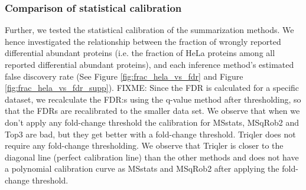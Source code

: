 \documentclass[10pt,letterpaper]{article}
\begin{document}
\subsubsection*{Comparison of statistical calibration}

Further, we tested the statistical calibration of the summarization methods. We hence investigated the relationship between the fraction of wrongly reported differential abundant proteins (i.e. the fraction of HeLa proteins among all reported differential abundant proteins), and each inference method's estimated false discovery rate (See Figure \ref{fig:frac_hela_vs_fdr} and Figure \ref{fig:frac_hela_vs_fdr_supp}). FIXME: Since the FDR is calculated for a specific dataset, we recalculate the FDR:s using the q-value method after thresholding, so that the FDRs are recalibrated to the smaller data set. We observe that when we don't apply any fold-change threshold the calibration for MSstats, MSqRob2 and Top3 are bad, but they get better with a fold-change threshold. Triqler does not require any fold-change thresholding. We observe that Triqler is closer to the diagonal line (perfect calibration line) than the other methods and does not have a polynomial calibration curve as MSstats and MSqRob2 after applying the fold-change threshold. 


\end{document}
